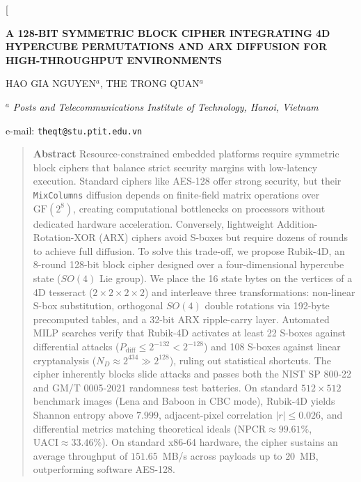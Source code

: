 \documentclass[10pt,twocolumn]{article}
\begin{document}
\twocolumn[
  \begin{@twocolumnfalse}
    \vspace{0.8cm}
    \begin{center}
      {\large \bfseries \MakeUppercase{A 128-Bit Symmetric Block Cipher Integrating 4D Hypercube Permutations and ARX Diffusion for High-Throughput Environments}\par}
      \vspace{0.6cm}
      
      {\normalsize \MakeUppercase{Hao Gia Nguyen}$^{a}$, \MakeUppercase{The Trong Quan}$^{a}$\par}
      \vspace{0.4cm}
      
      {\small $^{a}$ \textit{Posts and Telecommunications Institute of Technology, Hanoi, Vietnam}\par}
      
      {\small e-mail: \texttt{theqt@stu.ptit.edu.vn}\par}
      \vspace{0.6cm}
    \end{center}

    \begin{quote}
      \small
      \textbf{Abstract}  Resource-constrained embedded platforms require symmetric block ciphers that balance strict security margins with low-latency execution. Standard ciphers like AES-128 offer strong security, but their \texttt{MixColumns} diffusion depends on finite-field matrix operations over $\text{GF}(2^8)$, creating computational bottlenecks on processors without dedicated hardware acceleration. Conversely, lightweight Addition-Rotation-XOR (ARX) ciphers avoid S-boxes but require dozens of rounds to achieve full diffusion. To solve this trade-off, we propose Rubik-4D, an 8-round 128-bit block cipher designed over a four-dimensional hypercube state ($SO(4)$ Lie group). We place the 16 state bytes on the vertices of a 4D tesseract ($2 \times 2 \times 2 \times 2$) and interleave three transformations: non-linear S-box substitution, orthogonal $SO(4)$ double rotations via 192-byte precomputed tables, and a 32-bit ARX ripple-carry layer. Automated MILP searches verify that Rubik-4D activates at least 22 S-boxes against differential attacks ($P_{\text{diff}} \le 2^{-132} < 2^{-128}$) and 108 S-boxes against linear cryptanalysis ($N_D \approx 2^{434} \gg 2^{128}$), ruling out statistical shortcuts. The cipher inherently blocks slide attacks and passes both the NIST SP 800-22 and GM/T 0005-2021 randomness test batteries. On standard $512 \times 512$ benchmark images (Lena and Baboon in CBC mode), Rubik-4D yields Shannon entropy above $7.999$, adjacent-pixel correlation $|r| \le 0.026$, and differential metrics matching theoretical ideals ($\text{NPCR} \approx 99.61\%$, $\text{UACI} \approx 33.46\%$). On standard x86-64 hardware, the cipher sustains an average throughput of $151.65$~MB/s across payloads up to $20$~MB, outperforming software AES-128.
      \vspace{0.3cm}
      

\end{quote}
\end{@twocolumnfalse}
\end{document}
